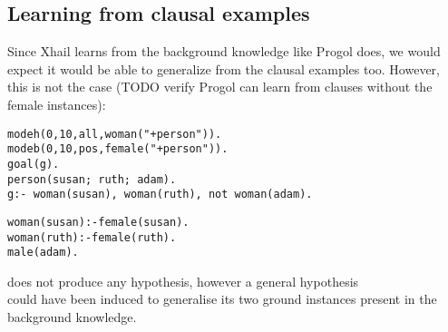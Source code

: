 \subsection{Learning from clausal examples}
Since Xhail learns from the background knowledge like Progol does, we would expect it would be able to generalize from the clausal examples too. However, this is not the case (TODO verify Progol can learn from clauses without the female instances):

\begin{minipage}[t]{.60\textwidth}
\begin{lstlisting}
modeh(0,10,all,woman("+person")).
modeb(0,10,pos,female("+person")).
goal(g).
person(susan; ruth; adam).
g:- woman(susan), woman(ruth), not woman(adam).
\end{lstlisting}
\end{minipage}
\begin{minipage}[t]{.20\textwidth}
\begin{lstlisting}
woman(susan):-female(susan).
woman(ruth):-female(ruth).
male(adam).
\end{lstlisting}
\end{minipage}

does not produce any hypothesis, however a general hypothesis\\
 could have been induced to generalise its two ground instances present in the background knowledge.

